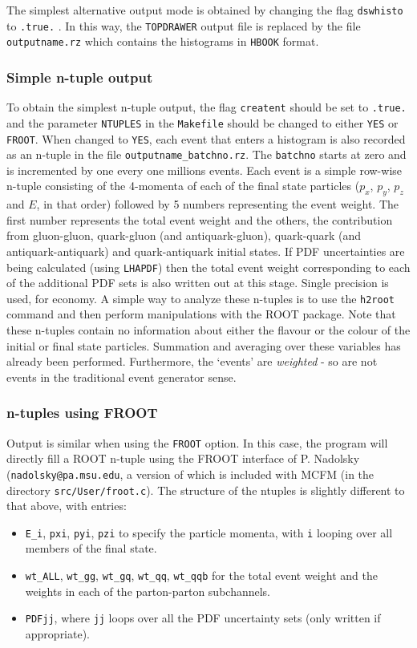 \documentclass[12pt]{article}
\begin{document}
The simplest alternative output mode is obtained by changing the flag
{\tt dswhisto} to {\tt .true.} . In this way, the {\tt TOPDRAWER} output file is
replaced by the file {\tt outputname.rz} which contains the histograms in {\tt HBOOK}
format.

\subsubsection{Simple n-tuple output}
To obtain the simplest n-tuple output, the flag {\tt creatent} should be set
to {\tt .true.} and the parameter {\tt NTUPLES} in the {\tt Makefile} should be changed
to either {\tt YES} or {\tt FROOT}. When changed to {\tt YES}, each event that enters a histogram
is also recorded as an n-tuple in the file {\tt outputname\_batchno.rz}. The {\tt batchno}
starts at zero and is incremented by one every one millions events. Each event
is a simple row-wise n-tuple consisting of the 4-momenta of each of the final
state particles ($p_x$, $p_y$, $p_z$ and $E$, in that order) followed by 5 numbers
representing the event weight. The first number represents the total event weight
and the others, the contribution from gluon-gluon, quark-gluon (and antiquark-gluon),
quark-quark (and antiquark-antiquark) and quark-antiquark initial states. If
PDF uncertainties are being calculated (using {\tt LHAPDF}) then the total event weight
corresponding to each of the additional PDF sets is also written out at this stage.
Single precision is used, for economy. A simple way to analyze 
these n-tuples is to use the {\tt h2root} command and then perform
manipulations with the ROOT package. Note that these n-tuples contain
no information about either the flavour or the colour of the initial or final
state particles. Summation and averaging over these variables has already been
performed. Furthermore, the `events' are {\it weighted} - so are not events
in the traditional event generator sense.

\subsubsection{n-tuples using FROOT}
Output is similar when using the {\tt FROOT} option. In this case, the program will directly
fill a ROOT n-tuple using the FROOT interface of P. Nadolsky ({\tt nadolsky@pa.msu.edu}, a version
of which is included with MCFM (in the directory {\tt src/User/froot.c}). The structure
of the ntuples is slightly different to that above, with entries:
\begin{itemize}
\item {\tt E\_i}, {\tt pxi}, {\tt pyi}, {\tt pzi} to specify the particle momenta, with {\tt i}
 looping over all members of the final state.
\item {\tt wt\_ALL}, {\tt wt\_gg}, {\tt wt\_gq}, {\tt wt\_qq}, {\tt wt\_qqb} for the total event
 weight and the weights in each of the parton-parton subchannels.
\item {\tt PDFjj}, where {\tt jj} loops over all the PDF uncertainty sets (only written if
 appropriate).
\end{itemize}
\end{document}
